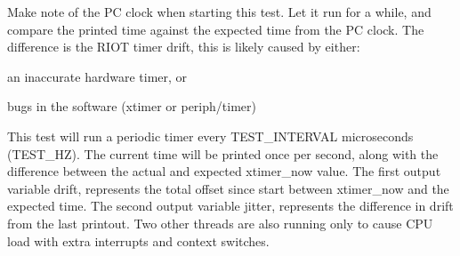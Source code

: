 Make note of the PC clock when starting this test. Let it run for a while, and compare the printed time against the expected time from the PC clock. The difference is the R\+I\+OT timer drift, this is likely caused by either\+:


\begin{DoxyItemize}
\item an inaccurate hardware timer, or
\item bugs in the software (xtimer or periph/timer)
\end{DoxyItemize}

This test will run a periodic timer every {\ttfamily T\+E\+S\+T\+\_\+\+I\+N\+T\+E\+R\+V\+AL} microseconds ({\ttfamily T\+E\+S\+T\+\_\+\+HZ}). The current time will be printed once per second, along with the difference between the actual and expected {\ttfamily xtimer\+\_\+now} value. The first output variable {\ttfamily drift}, represents the total offset since start between {\ttfamily xtimer\+\_\+now} and the expected time. The second output variable {\ttfamily jitter}, represents the difference in drift from the last printout. Two other threads are also running only to cause C\+PU load with extra interrupts and context switches. 